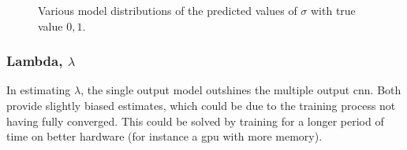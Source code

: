\documentclass[11pt,oneside,openany,a4paper,english, report, goldenblock
]{usthesis}
\begin{document}
\begin{figure}[h]
{\begin{subfloatrow}
%			
%			
%		
%		
		
		
	\end{subfloatrow}
}{
		
		\caption{Various model distributions of the predicted values of $\sigma$ with true value $0,1$.}
		\label{fig:individual-parameter-estimation-results--sigma}}
\end{figure}

\subsubsection{Lambda, $\lambda$}
In estimating $\lambda$, the single output model outshines the multiple output \acrshort{cnn}. Both provide slightly biased estimates, which could be due to the training process not having fully converged. This could be solved by training for a longer period of time on better hardware (for instance a \acrshort{gpu} with more memory).
\end{document}
